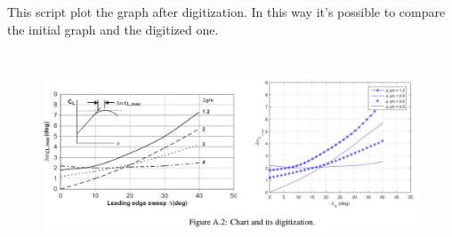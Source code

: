 \noindent \\ \\ 
This script plot the graph after digitization. In this way it's possible to compare the initial graph and the digitized one.


 \begin{figure}[H]
\centering
{\includegraphics[height=6cm]{Immagini/digitize2.png}} 
\label{angles}
\end{figure} 



